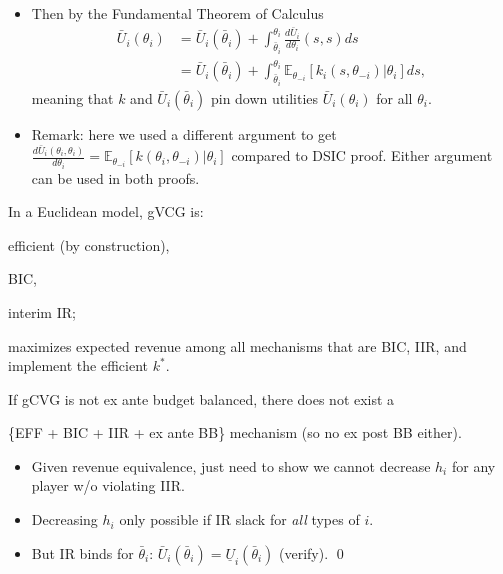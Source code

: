 \documentclass[english,handout,10pt]{beamer}		%
\def\lyxframeend{} %
\begin{document}
\begin{itemize}
	\item Then by the Fundamental Theorem of Calculus
	\begin{align*}
		\bar{U}_i (\theta_i) &= \bar{U}_i (\bar{\theta}_i) + \int_{\bar{\theta}_i}^{\theta_i} \frac{d \bar{U}_i}{d \theta_i}(s,s) d s
		\\&= \bar{U}_i (\bar{\theta}_i) + \int_{\bar{\theta}_i}^{\theta_i} \mathbb{E}_{\theta_{-i}} \left[k_i(s,\theta_{-i}) | \theta_i \right] d s,
	\end{align*}
	meaning that $k$ and $\bar{U}_i (\bar{\theta}_i)$ pin down utilities $\bar{U}_i (\theta_i)$ for all $\theta_i$.
	\medskip
	\item Remark: here we used a different argument to get $\frac{d \bar{U}_i (\theta_i,\theta_{i})}{d \theta_i} = \mathbb{E}_{\theta_{-i}} \left[k(\theta_i,\theta_{-i}) | \theta_i \right]$ compared to DSIC proof. Either argument can be used in both proofs.
\end{itemize}
\lyxframeend


\begin{theorem}
	In a \alert{Euclidean} model, gVCG is:
	\begin{itemize}{\color{gray}
		\item efficient (by construction),
		\item BIC,
		\item interim IR;}
		\item maximizes expected revenue among all mechanisms that are BIC, IIR, and implement the efficient $k^*$.
	\end{itemize}
\end{theorem}
If gCVG is not ex ante budget balanced, there does not exist a 

\{EFF + BIC + IIR + ex ante BB\} mechanism (so no ex post BB either).
\lyxframeend


\begin{itemize}
	\item Given revenue equivalence, just need to show we cannot decrease $h_i$ for any player w/o violating IIR.
	\pause
	\item Decreasing $h_i$ only possible if IR slack for \emph{all} types of $i$.
	\pause
	\item But IR binds for $\bar{\theta}_i$: $\bar{U}_i (\bar{\theta}_i) = \underline{U}_i (\bar{\theta}_i)$ (verify). \qed
\end{itemize}
\lyxframeend
\end{document}

